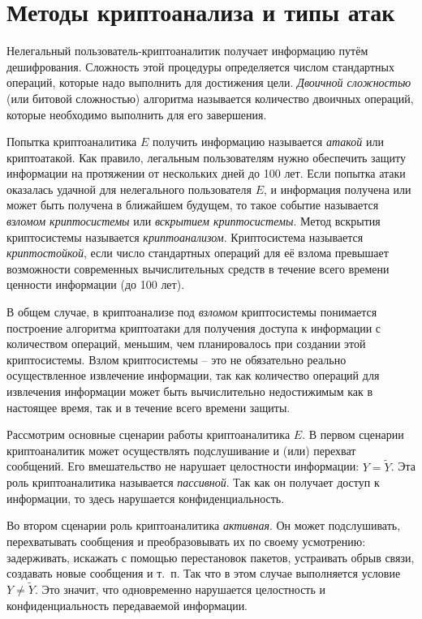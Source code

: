 ﻿\section{Методы криптоанализа и типы атак}

Нелегальный пользователь-криптоаналитик получает информацию путём дешифрования. Сложность этой процедуры определяется числом стандартных операций, которые надо выполнить для достижения цели. \emph{Двоичной сложностью} (или битовой сложностью) алгоритма называется количество двоичных операций, которые необходимо выполнить для его завершения.

Попытка криптоаналитика $E$ получить информацию называется \emph{атакой} или криптоатакой. Как правило, легальным пользователям нужно обеспечить защиту информации на протяжении от нескольких дней до 100 лет. Если попытка атаки оказалась удачной для нелегального пользователя $E$, и информация получена или может быть получена в ближайшем будущем, то такое событие называется \emph{взломом криптосистемы} или \emph{вскрытием криптосистемы}. Метод вскрытия криптосистемы называется \emph{криптоанализом}. Криптосистема называется \emph{криптостойкой}, если число стандартных операций для её взлома превышает возможности современных вычислительных средств в течение всего времени ценности информации (до 100 лет).

В общем случае, в криптоанализе под \emph{взломом} криптосистемы понимается построение алгоритма криптоатаки для получения доступа к информации с количеством операций, меньшим, чем планировалось при создании этой криптосистемы. Взлом криптосистемы -- это не обязательно реально осуществленное извлечение информации, так как количество операций для извлечения информации может быть вычислительно недостижимым как в настоящее время, так и в течение всего времени защиты.

Рассмотрим основные сценарии работы криптоаналитика $E$. В первом сценарии криптоаналитик может осуществлять подслушивание и (или) перехват сообщений. Его вмешательство не нарушает целостности информации: $Y=\widetilde{Y}$. Эта роль криптоаналитика называется \emph{пассивной}. Так как он получает доступ к информации, то здесь нарушается конфиденциальность.

Во втором сценарии роль криптоаналитика \emph{активная}. Он может подслушивать, перехватывать сообщения и преобразовывать их по своему усмотрению: задерживать, искажать с помощью перестановок пакетов, устраивать обрыв связи, создавать новые сообщения и т.~п. Так что в этом случае выполняется условие $Y \neq \widetilde{Y}$. Это значит, что одновременно нарушается целостность и конфиденциальность передаваемой информации.

